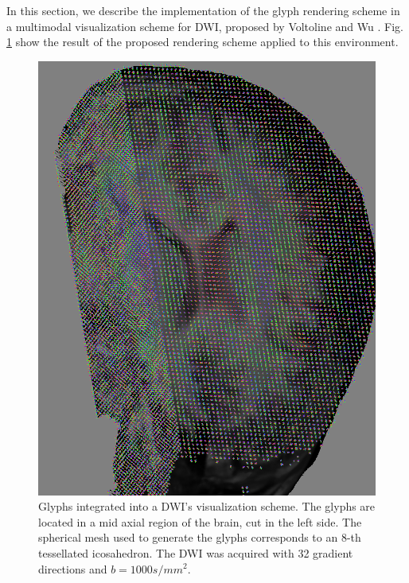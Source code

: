 \documentclass[twoside,twocolumn,10pt]{article}
\begin{document}
In this section, we describe the implementation of the glyph rendering scheme in a multimodal visualization scheme for DWI, proposed by Voltoline and Wu \cite{voltoline2021}. Fig. \ref{fig::ex_glyph_DWI_visualization} show the result of the proposed rendering scheme applied to this environment.

\begin{figure}[ht]
    \centering
    \includegraphics[width=1.00\linewidth, angle=0]{figs/Results/glyphs_integrated_DWI.png}
    \caption{Glyphs integrated into a DWI's visualization scheme. The glyphs are located in a mid axial region of the brain, cut in the left side. The spherical mesh used to generate the glyphs corresponds to an 8-th tessellated icosahedron. The DWI was acquired with 32 gradient directions and $b=1000s/mm^2$.
    }
    \label{fig::ex_glyph_DWI_visualization}
\end{figure}

\end{document}
